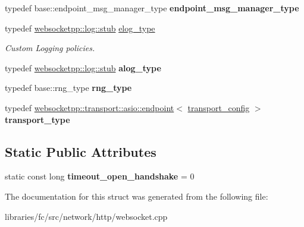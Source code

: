 \begin{DoxyCompactItemize}
typedef base\+::endpoint\+\_\+msg\+\_\+manager\+\_\+type {\bfseries endpoint\+\_\+msg\+\_\+manager\+\_\+type}
\item 
\mbox{\label{structfc_1_1http_1_1detail_1_1asio__with__stub__log_a5be4919ddde517477acb81e13cc3826d}} 
typedef \mbox{\hyperlink{classwebsocketpp_1_1log_1_1stub}{websocketpp\+::log\+::stub}} \mbox{\hyperlink{structfc_1_1http_1_1detail_1_1asio__with__stub__log_a5be4919ddde517477acb81e13cc3826d}{elog\+\_\+type}}
\begin{DoxyCompactList}\small\item\em Custom Logging policies. \end{DoxyCompactList}\item 
\mbox{\label{structfc_1_1http_1_1detail_1_1asio__with__stub__log_aca0f41c2b685dc44269aaacac8f7755d}} 
typedef \mbox{\hyperlink{classwebsocketpp_1_1log_1_1stub}{websocketpp\+::log\+::stub}} {\bfseries alog\+\_\+type}
\item 
\mbox{\label{structfc_1_1http_1_1detail_1_1asio__with__stub__log_afdec4829054da0307b13b3d53caebb6a}} 
typedef base\+::rng\+\_\+type {\bfseries rng\+\_\+type}
\item 
\mbox{\label{structfc_1_1http_1_1detail_1_1asio__with__stub__log_a204d80e4b40f6e8120006ae2d91b5880}} 
typedef \mbox{\hyperlink{classwebsocketpp_1_1transport_1_1asio_1_1endpoint}{websocketpp\+::transport\+::asio\+::endpoint}}$<$ \mbox{\hyperlink{structfc_1_1http_1_1detail_1_1asio__with__stub__log_1_1transport__config}{transport\+\_\+config}} $>$ {\bfseries transport\+\_\+type}
\end{DoxyCompactItemize}
\subsection*{Static Public Attributes}
\begin{DoxyCompactItemize}
\item 
\mbox{\label{structfc_1_1http_1_1detail_1_1asio__with__stub__log_a1a80701fc3d34b40681f2105aff5242b}} 
static const long {\bfseries timeout\+\_\+open\+\_\+handshake} = 0
\end{DoxyCompactItemize}


The documentation for this struct was generated from the following file\+:\begin{DoxyCompactItemize}
\item 
libraries/fc/src/network/http/websocket.\+cpp\end{DoxyCompactItemize}

